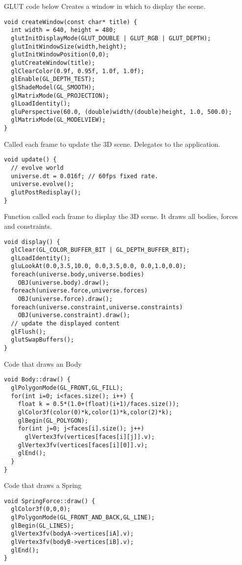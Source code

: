 GLUT code below
Creates a window in which to display the scene.
\begin{lstlisting}
void createWindow(const char* title) {
  int width = 640, height = 480;
  glutInitDisplayMode(GLUT_DOUBLE | GLUT_RGB | GLUT_DEPTH);
  glutInitWindowSize(width,height);
  glutInitWindowPosition(0,0);
  glutCreateWindow(title);
  glClearColor(0.9f, 0.95f, 1.0f, 1.0f);
  glEnable(GL_DEPTH_TEST);
  glShadeModel(GL_SMOOTH);  
  glMatrixMode(GL_PROJECTION);
  glLoadIdentity();
  gluPerspective(60.0, (double)width/(double)height, 1.0, 500.0);
  glMatrixMode(GL_MODELVIEW);
}
\end{lstlisting}

Called each frame to update the 3D scene. Delegates to
the application.
\begin{lstlisting}
void update() {
  // evolve world
  universe.dt = 0.016f;	// 60fps fixed rate.
  universe.evolve();
  glutPostRedisplay();
}
\end{lstlisting}

Function called each frame to display the 3D scene.
It draws all bodies, forces and constraints.
\begin{lstlisting}
void display() {
  glClear(GL_COLOR_BUFFER_BIT | GL_DEPTH_BUFFER_BIT);
  glLoadIdentity();
  gluLookAt(0.0,3.5,10.0, 0.0,3.5,0.0, 0.0,1.0,0.0);
  foreach(universe.body,universe.bodies)
    OBJ(universe.body).draw();
  foreach(universe.force,universe.forces)
    OBJ(universe.force).draw();
  foreach(universe.constraint,universe.constraints)
    OBJ(universe.constraint).draw();
  // update the displayed content
  glFlush();
  glutSwapBuffers();
}
\end{lstlisting}

Code that draws an Body
\begin{lstlisting}
void Body::draw() {
  glPolygonMode(GL_FRONT,GL_FILL);
  for(int i=0; i<faces.size(); i++) {      
    float k = 0.5*(1.0+(float)(i+1)/faces.size());
    glColor3f(color(0)*k,color(1)*k,color(2)*k);    
    glBegin(GL_POLYGON);        
    for(int j=0; j<faces[i].size(); j++)
      glVertex3fv(vertices[faces[i][j]].v);
    glVertex3fv(vertices[faces[i][0]].v);
    glEnd();
  }
}
\end{lstlisting}

Code that draws a Spring
\begin{lstlisting}
void SpringForce::draw() {
  glColor3f(0,0,0);
  glPolygonMode(GL_FRONT_AND_BACK,GL_LINE);
  glBegin(GL_LINES);
  glVertex3fv(bodyA->vertices[iA].v);
  glVertex3fv(bodyB->vertices[iB].v);
  glEnd();
}
\end{lstlisting}

